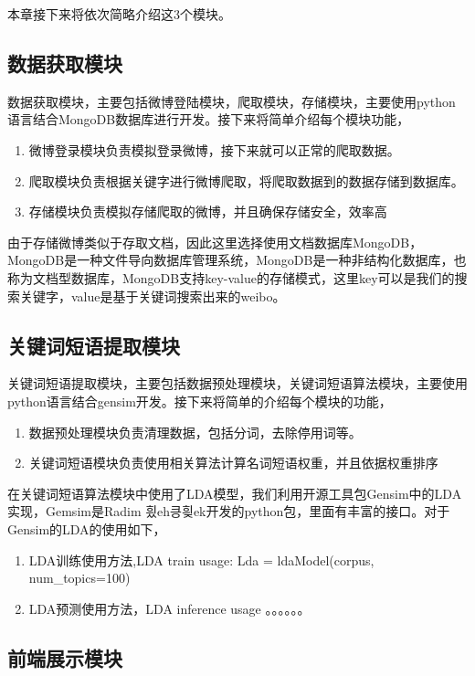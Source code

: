 \documentclass[master]{njuthesis}
\begin{document}
    本章接下来将依次简略介绍这3个模块。

\subsection{数据获取模块}
   
    数据获取模块，主要包括微博登陆模块，爬取模块，存储模块，主要使用python语言结合MongoDB数据库进行开发。接下来将简单介绍每个模块功能，
    \begin{enumerate}
      \item 微博登录模块负责模拟登录微博，接下来就可以正常的爬取数据。
      \item 爬取模块负责根据关键字进行微博爬取，将爬取数据到的数据存储到数据库。
      \item 存储模块负责模拟存储爬取的微博，并且确保存储安全，效率高
    \end{enumerate}

    由于存储微博类似于存取文档，因此这里选择使用文档数据库MongoDB，MongoDB是一种文件导向数据库管理系统，MongoDB是一种非结构化数据库，也称为文档型数据库，MongoDB支持key-value的存储模式，这里key可以是我们的搜索关键字，value是基于关键词搜索出来的weibo。

\subsection{关键词短语提取模块}
    
    关键词短语提取模块，主要包括数据预处理模块，关键词短语算法模块，主要使用python语言结合gensim开发。接下来将简单的介绍每个模块的功能，
    \begin{enumerate}
      \item 数据预处理模块负责清理数据，包括分词，去除停用词等。
      \item 关键词短语模块负责使用相关算法计算名词短语权重，并且依据权重排序
    \end{enumerate}
    
    在关键词短语算法模块中使用了LDA模型，我们利用开源工具包Gensim中的LDA实现，Gemsim是Radim 힀eh킁힂ek开发的python包，里面有丰富的接口。对于Gensim的LDA的使用如下，
    \begin{enumerate}
      \item LDA训练使用方法,LDA train usage: Lda = ldaModel(corpus, num\_topics=100)
      \item LDA预测使用方法，LDA inference usage 。。。。。。
    \end{enumerate}

\subsection{前端展示模块}
    
\end{document}
